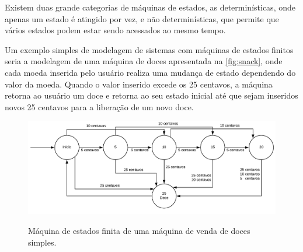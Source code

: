Existem duas grande categorias de máquinas de estados, as determinísticas, onde apenas um estado é atingido por vez, e não determinísticas, que permite que vários estados podem estar sendo acessados ao mesmo tempo. \cite{hopcroft:2001}

Um exemplo simples de modelagem de sistemas com máquinas de estados finitos seria a modelagem de uma máquina de doces apresentada na \autoref{fig:snack}, onde cada moeda inserida pelo usuário realiza uma mudança de estado dependendo do valor da moeda. Quando o valor inserido excede os 25 centavos, a máquina retorna ao usuário um doce e retorna ao seu estado inicial até que sejam inseridos novos 25 centavos para a liberação de um novo doce.

\begin{figure}[ht]
    \centering
    \caption{Máquina de estados finita de uma máquina de venda de doces simples.}
    \includegraphics[width=\textwidth, keepaspectratio]{resources/fsm.pdf}
    \label{fig:snack}
\end{figure}

 \newpage




